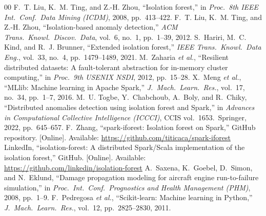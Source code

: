\documentclass[conference]{IEEEtran}
\begin{document}
\begin{thebibliography}{00}
 F.~T. Liu, K.~M. Ting, and Z.-H. Zhou, ``Isolation forest,'' in \emph{Proc.\ 8th IEEE Int.\ Conf.\ Data Mining (ICDM)}, 2008, pp.\ 413--422.
 F.~T. Liu, K.~M. Ting, and Z.-H. Zhou, ``Isolation-based anomaly detection,'' \emph{ACM Trans.\ Knowl.\ Discov.\ Data}, vol.\ 6, no.\ 1, pp.\ 1--39, 2012.
 S.~Hariri, M.~C. Kind, and R.~J. Brunner, ``Extended isolation forest,'' \emph{IEEE Trans.\ Knowl.\ Data Eng.}, vol.\ 33, no.\ 4, pp.\ 1479--1489, 2021.
 M.~Zaharia \emph{et al.}, ``Resilient distributed datasets: A fault-tolerant abstraction for in-memory cluster computing,'' in \emph{Proc.\ 9th USENIX NSDI}, 2012, pp.\ 15--28.
 X.~Meng \emph{et al.}, ``MLlib: Machine learning in Apache Spark,'' \emph{J.\ Mach.\ Learn.\ Res.}, vol.\ 17, no.\ 34, pp.\ 1--7, 2016.
 M.~U. Togbe, Y.~Chabchoub, A.~Boly, and R.~Chiky, ``Distributed anomalies detection using isolation forest and Spark,'' in \emph{Advances in Computational Collective Intelligence (ICCCI)}, CCIS vol.\ 1653.\ Springer, 2022, pp.\ 645--657.
 F.~Zhang, ``spark-iforest: Isolation forest on Spark,'' GitHub repository. [Online]. Available: \url{https://github.com/titicaca/spark-iforest}
 LinkedIn, ``isolation-forest: A distributed Spark/Scala implementation of the isolation forest,'' GitHub. [Online]. Available: \url{https://github.com/linkedin/isolation-forest}
 A.~Saxena, K.~Goebel, D.~Simon, and N.~Eklund, ``Damage propagation modeling for aircraft engine run-to-failure simulation,'' in \emph{Proc.\ Int.\ Conf.\ Prognostics and Health Management (PHM)}, 2008, pp.\ 1--9.
 F.~Pedregosa \emph{et al.}, ``Scikit-learn: Machine learning in Python,'' \emph{J.\ Mach.\ Learn.\ Res.}, vol.\ 12, pp.\ 2825--2830, 2011.
\end{thebibliography}
\end{document}
